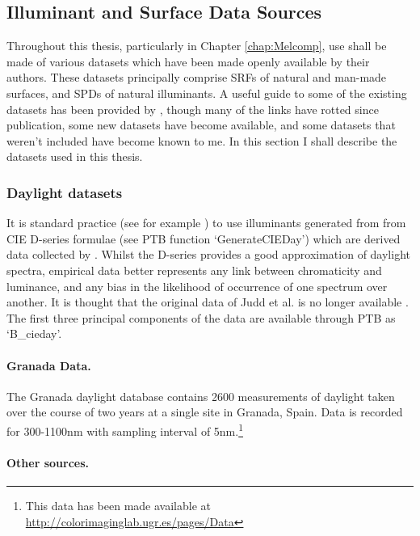 \subsection{Illuminant and Surface Data Sources}

Throughout this thesis, particularly in Chapter \ref{chap:Melcomp}, use shall be made of various datasets which have been made openly available by their authors. These datasets principally comprise \glspl{SRF} of natural and man-made surfaces, and \glspl{SPD} of natural illuminants. A useful guide to some of the existing datasets has been provided by \citet{kohonen_databases_2006}, though many of the links have rotted since publication, some new datasets have become available, and some datasets that weren't included have become known to me. In this section I shall describe the datasets used in this thesis.

\subsubsection{Daylight datasets}

It is standard practice (see for example \citet{barrionuevo_contributions_2014}) to use illuminants generated from from CIE D-series formulae (see \gls{PTB} function `GenerateCIEDay') which are derived data collected by \citet{judd_spectral_1964}. Whilst the D-series provides a good approximation of daylight spectra, empirical data better represents any link between chromaticity and luminance, and any bias in the likelihood of occurrence of one spectrum over another. It is thought that the original data of Judd et al. is no longer available \citep[p.~60]{maloney_computational_1984}. The first three principal components of the data are available through \gls{PTB} as `B\_cieday'.

\paragraph{Granada Data.}
The Granada daylight database \citep{hernandez-andres_color_2001} contains 2600 measurements of daylight taken over the course of two years at a single site in Granada, Spain. Data is recorded for 300-1100nm with sampling interval of 5nm.\footnote{This data has been made available at \url{http://colorimaginglab.ugr.es/pages/Data}}

\paragraph{Other sources.}

